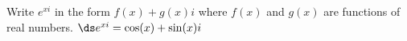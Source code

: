 {Write $e^{xi}$ in the form $f(x)+g(x)i$ where $f(x)$ and $g(x)$ are functions of real numbers.
}
{$\ds e^{xi}=\cos(x)+\sin(x) i $
}
